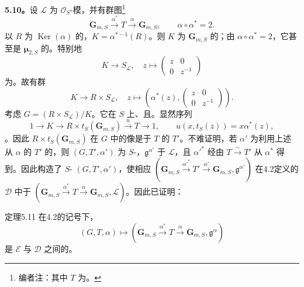 \textbf{5.10。}设 $\mathscr L$ 为 $\mathscr O_S$-模，并有群图\footnote{编者注：其中 $T$ 为。}
\[\mathbf G_{m,S}\xrightarrow{\alpha^*}T\xrightarrow\alpha\mathbf G_{m,S},\qquad\alpha\circ\alpha^*=2.\]
以 $R$ 为 $\operatorname{Ker}(\alpha)$ 的，$K=\alpha^{*-1}(R)$。则 $K$ 为 $\mathbf G_{m,S}$ 的；由 $\alpha\circ\alpha^*=2$，它甚至是 $\boldsymbol\mu_{2,S}$ 的。特别地
\[K\longrightarrow S_{\mathscr L},\quad z\longmapsto\begin{pmatrix}z&0\\0&z^{-1}\end{pmatrix}\]
为。故有群
\[K\longrightarrow R\times S_{\mathscr L},\quad z\longmapsto\left(\alpha^*(z),\begin{pmatrix}z&0\\0&z^{-1}\end{pmatrix}\right).\]
考虑 $G=(R\times S_{\mathscr L})/K$。它在 $S$ 上、且。显然序列
\[1\longrightarrow K\longrightarrow R\times t_S(\mathbf G_{m,S})\xrightarrow uT\longrightarrow1,\qquad u(x,t_S(z))=x\alpha^*(z),\]
。因此 $R\times t_S(\mathbf G_{m,S})$ 在 $G$ 中的像是于 $T$ 的 $T'$。不难证明，若 $\alpha'$ 为利用上述从 $\alpha$ 的 $T'$ 的，则 $(G,T',\alpha')$ 为 $S$-，$\mathfrak g^{\alpha'}$ 于 $\mathscr L$，且 $\alpha'^*$ 经由 $T\xrightarrow\sim T'$ 从 $\alpha^*$ 得到。因此构造了 $S$- $(G,T',\alpha')$，使相应
$(\mathbf G_{m,S}\xrightarrow{\alpha'^*}T'\xrightarrow{\alpha'}\mathbf G_{m,S},\mathfrak g^{\alpha'})$ 在4.2定义的 $\mathscr D$ 中于 $(\mathbf G_{m,S}\xrightarrow{\alpha^*}T\xrightarrow\alpha\mathbf G_{m,S},\mathscr L)$。因此已证明：
\begin{SGAresult}{定理}{5.11}
在4.2的记号下，
\[(G,T,\alpha)\longmapsto(\mathbf G_{m,S}\xrightarrow{\alpha^*}T\xrightarrow\alpha\mathbf G_{m,S},\mathfrak g^\alpha)\]
是 $\mathscr E$ 与 $\mathscr D$ 之间的。
\end{SGAresult}
